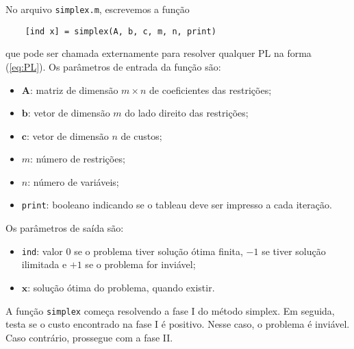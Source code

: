 \documentclass[12pt,a4paper]{article}
\newcommand{\vet}{\mathbf}                                   %
\begin{document}
No arquivo \verb|simplex.m|, escrevemos a função 
%
\begin{verbatim}
	[ind x] = simplex(A, b, c, m, n, print)
\end{verbatim}  
%
que pode ser chamada externamente para resolver qualquer PL na forma (\ref{eq:PL}). 
Os parâmetros de entrada da função são:
%
\begin{itemize}
	\item $\vet{A}$: matriz de dimensão $m \times n$ de coeficientes das restrições;
	\item $\vet{b}$: vetor de dimensão $m$ do lado direito das restrições;
	\item $\vet{c}$: vetor de dimensão $n$ de custos;
	\item $m$: número de restrições;
	\item $n$: número de variáveis;
	\item \verb|print|: booleano indicando se o tableau deve ser impresso a cada iteração.  
\end{itemize} 
%
Os parâmetros de saída são:
%
\begin{itemize}
	\item \verb|ind|: valor $0$ se o problema tiver solução ótima finita, $-1$ se tiver solução
	ilimitada e $+1$ se o problema for inviável;
	\item $\vet{x}$: solução ótima do problema, quando existir.
\end{itemize}
%
A função \verb|simplex| começa resolvendo a fase I do método simplex. Em seguida, testa se o custo
encontrado na fase I é positivo. Nesse caso, o problema é inviável. Caso contrário, prossegue com
a fase II. 
\end{document}
